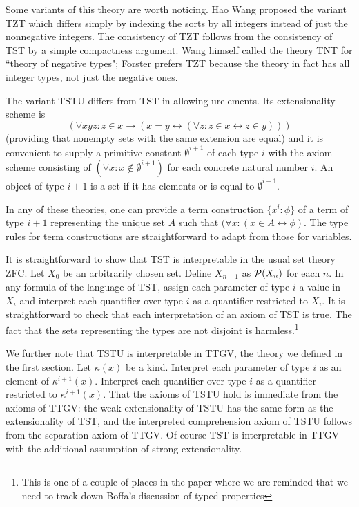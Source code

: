 \documentclass[12pt]{article}
\begin{document}
Some variants of this theory are worth noticing.  Hao Wang proposed the variant TZT which differs simply by indexing the sorts by all integers instead of just the nonnegative integers.  The consistency of TZT follows from the consistency of TST by a simple compactness argument.  Wang himself called the theory TNT for ``theory of negative types";  Forster prefers TZT because the theory in fact has all integer types, not just the negative ones.

The variant TSTU differs from TST in allowing urelements.  Its extensionality scheme is $$(\forall xyz:z\in x \rightarrow(x=y \leftrightarrow (\forall z:z\in x \leftrightarrow z \in y)))$$ (providing that nonempty sets with the same extension are equal) and it is convenient to supply a primitive constant $\emptyset^{i+1}$ of each type $i$ with the axiom scheme consisting of $(\forall x:x \not\in \emptyset^{i+1})$ for each concrete natural number $i$.  An object of type $i+1$ is a set if it has elements or is equal to $\emptyset^{i+1}$.

In any of these theories, one can provide a term construction $\{x^i:\phi\}$ of a term of type $i+1$ representing the unique set $A$ such that $(\forall x:(x \in A \leftrightarrow \phi)$.  The type rules for term constructions are straightforward to adapt from those for variables.

It is straightforward to show that TST is interpretable in the usual set theory ZFC.  Let $X_0$ be an arbitrarily chosen set. Define $X_{n+1}$ as ${\cal P}(X_n)$ for each $n$.  In any formula of the language of TST, assign each parameter
of type $i$ a value in $X_i$ and interpret each quantifier over type $i$ as a quantifier restricted to $X_i$.  It is straightforward to check that each interpretation of an axiom of TST is true.   The fact that the sets representing the types are not disjoint is harmless.\footnote{This is one of a couple of places in the paper where we are reminded that we need to track down Boffa's discussion of typed properties}

We further note that TSTU is interpretable in TTGV, the theory we defined in the first section.  Let $\kappa(x)$ be a kind.  Interpret each parameter of type $i$ as an element of $\kappa^{i+1}(x)$.  Interpret each quantifier over type $i$ as a quantifier restricted to $\kappa^{i+1}(x)$.  That the axioms of TSTU hold is immediate from the axioms of TTGV:  the weak extensionality of TSTU has the same form as the extensionality of TST, and the interpreted comprehension axiom of TSTU follows from
the separation axiom of TTGV.  Of course TST is interpretable in TTGV with the additional assumption of strong extensionality.
\end{document}
